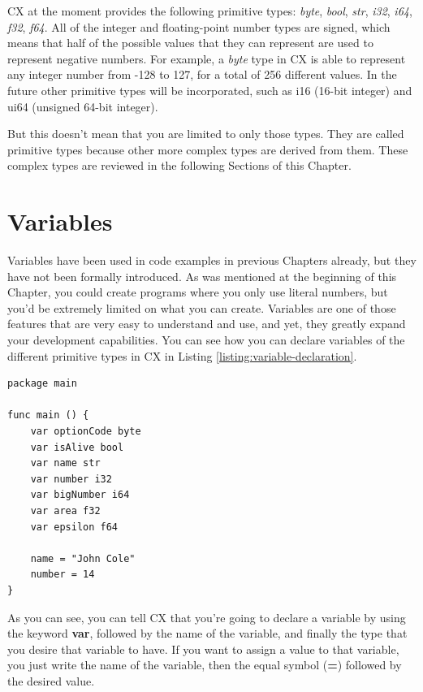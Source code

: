 \documentclass[11pt,fleqn,openany]{book} %
\begin{document}
CX at the moment provides the following primitive types: \textit{byte}, \textit{bool}, \textit{str}, \textit{i32}, \textit{i64}, \textit{f32}, \textit{f64}. All of the integer and floating-point number types are signed, which means that half of the possible values that they can represent are used to represent negative numbers. For example, a \textit{byte} type in CX is able to represent any integer number from -128 to 127, for a total of 256 different values. In the future other primitive types will be incorporated, such as i16 (16-bit integer) and ui64 (unsigned 64-bit integer).

But this doesn't mean that you are limited to only those types. They are called primitive types because other more complex types are derived from them. These complex types are reviewed in the following Sections of this Chapter.

\section{Variables}

Variables have been used in code examples in previous Chapters already, but they have not been formally introduced. As was mentioned at the beginning of this Chapter, you could create programs where you only use literal numbers, but you'd be extremely limited on what you can create. Variables are one of those features that are very easy to understand and use, and yet, they greatly expand your development capabilities. You can see how you can declare variables of the different primitive types in CX in Listing \ref{listing:variable-declaration}.

\begin{lstlisting}[caption={Variable Declaration},captionpos=b,label={listing:variable-declaration}]
package main

func main () {
	var optionCode byte
	var isAlive bool
	var name str
	var number i32
	var bigNumber i64
	var area f32
	var epsilon f64
    
    name = "John Cole"
    number = 14
}
\end{lstlisting}

As you can see, you can tell CX that you're going to declare a variable by using the keyword \textbf{var}, followed by the name of the variable, and finally the type that you desire that variable to have. If you want to assign a value to that variable, you just write the name of the variable, then the equal symbol (\textbf{=}) followed by the desired value.
\end{document}
